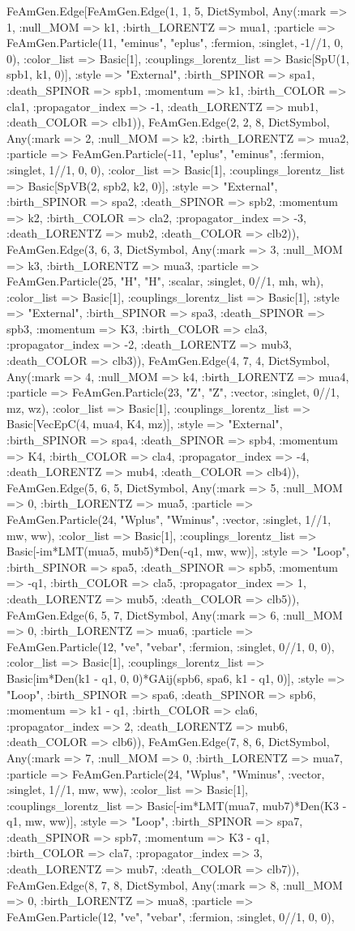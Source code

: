 \documentclass{revtex4}
\begin{document}
\begin{figure}[!htb]
\begin{center}
{FeAmGen.Edge[FeAmGen.Edge(1, 1, 5, Dict{Symbol, Any}(:mark => 1, :null_MOM => k1, :birth_LORENTZ => mua1, :particle => FeAmGen.Particle(11, "eminus", "eplus", :fermion, :singlet, -1//1, 0, 0), :color_list => Basic[1], :couplings_lorentz_list => Basic[SpU(1, spb1, k1, 0)], :style => "External", :birth_SPINOR => spa1, :death_SPINOR => spb1, :momentum => k1, :birth_COLOR => cla1, :propagator_index => -1, :death_LORENTZ => mub1, :death_COLOR => clb1)), FeAmGen.Edge(2, 2, 8, Dict{Symbol, Any}(:mark => 2, :null_MOM => k2, :birth_LORENTZ => mua2, :particle => FeAmGen.Particle(-11, "eplus", "eminus", :fermion, :singlet, 1//1, 0, 0), :color_list => Basic[1], :couplings_lorentz_list => Basic[SpVB(2, spb2, k2, 0)], :style => "External", :birth_SPINOR => spa2, :death_SPINOR => spb2, :momentum => k2, :birth_COLOR => cla2, :propagator_index => -3, :death_LORENTZ => mub2, :death_COLOR => clb2)), FeAmGen.Edge(3, 6, 3, Dict{Symbol, Any}(:mark => 3, :null_MOM => k3, :birth_LORENTZ => mua3, :particle => FeAmGen.Particle(25, "H", "H", :scalar, :singlet, 0//1, mh, wh), :color_list => Basic[1], :couplings_lorentz_list => Basic[1], :style => "External", :birth_SPINOR => spa3, :death_SPINOR => spb3, :momentum => K3, :birth_COLOR => cla3, :propagator_index => -2, :death_LORENTZ => mub3, :death_COLOR => clb3)), FeAmGen.Edge(4, 7, 4, Dict{Symbol, Any}(:mark => 4, :null_MOM => k4, :birth_LORENTZ => mua4, :particle => FeAmGen.Particle(23, "Z", "Z", :vector, :singlet, 0//1, mz, wz), :color_list => Basic[1], :couplings_lorentz_list => Basic[VecEpC(4, mua4, K4, mz)], :style => "External", :birth_SPINOR => spa4, :death_SPINOR => spb4, :momentum => K4, :birth_COLOR => cla4, :propagator_index => -4, :death_LORENTZ => mub4, :death_COLOR => clb4)), FeAmGen.Edge(5, 6, 5, Dict{Symbol, Any}(:mark => 5, :null_MOM => 0, :birth_LORENTZ => mua5, :particle => FeAmGen.Particle(24, "Wplus", "Wminus", :vector, :singlet, 1//1, mw, ww), :color_list => Basic[1], :couplings_lorentz_list => Basic[-im*LMT(mua5, mub5)*Den(-q1, mw, ww)], :style => "Loop", :birth_SPINOR => spa5, :death_SPINOR => spb5, :momentum => -q1, :birth_COLOR => cla5, :propagator_index => 1, :death_LORENTZ => mub5, :death_COLOR => clb5)), FeAmGen.Edge(6, 5, 7, Dict{Symbol, Any}(:mark => 6, :null_MOM => 0, :birth_LORENTZ => mua6, :particle => FeAmGen.Particle(12, "ve", "vebar", :fermion, :singlet, 0//1, 0, 0), :color_list => Basic[1], :couplings_lorentz_list => Basic[im*Den(k1 - q1, 0, 0)*GAij(spb6, spa6, k1 - q1, 0)], :style => "Loop", :birth_SPINOR => spa6, :death_SPINOR => spb6, :momentum => k1 - q1, :birth_COLOR => cla6, :propagator_index => 2, :death_LORENTZ => mub6, :death_COLOR => clb6)), FeAmGen.Edge(7, 8, 6, Dict{Symbol, Any}(:mark => 7, :null_MOM => 0, :birth_LORENTZ => mua7, :particle => FeAmGen.Particle(24, "Wplus", "Wminus", :vector, :singlet, 1//1, mw, ww), :color_list => Basic[1], :couplings_lorentz_list => Basic[-im*LMT(mua7, mub7)*Den(K3 - q1, mw, ww)], :style => "Loop", :birth_SPINOR => spa7, :death_SPINOR => spb7, :momentum => K3 - q1, :birth_COLOR => cla7, :propagator_index => 3, :death_LORENTZ => mub7, :death_COLOR => clb7)), FeAmGen.Edge(8, 7, 8, Dict{Symbol, Any}(:mark => 8, :null_MOM => 0, :birth_LORENTZ => mua8, :particle => FeAmGen.Particle(12, "ve", "vebar", :fermion, :singlet, 0//1, 0, 0), }
\end{center}
\end{figure}
\end{document}
